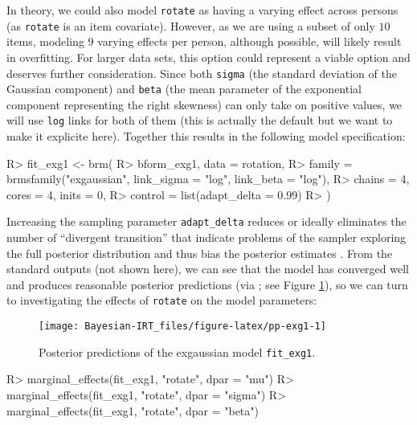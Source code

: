 \documentclass[jss]{jss}
\begin{document}
In theory, we could also model \texttt{rotate} as having a varying
effect across persons (as \texttt{rotate} is an item covariate).
However, as we are using a subset of only \(10\) items, modeling \(9\)
varying effects per person, although possible, will likely result in
overfitting. For larger data sets, this option could represent a viable
option and deserves further consideration. Since both \texttt{sigma}
(the standard deviation of the Gaussian component) and \texttt{beta}
(the mean parameter of the exponential component representing the right
skewness) can only take on positive values, we will use \texttt{log}
links for both of them (this is actually the default but we want to make
it explicite here). Together this results in the following model
specification:

\begin{CodeChunk}

\begin{CodeInput}
R> fit_exg1 <- brm(
R>   bform_exg1, data = rotation,
R>   family = brmsfamily("exgaussian", link_sigma = "log", link_beta = "log"),
R>   chains = 4, cores = 4, inits = 0,
R>   control = list(adapt_delta = 0.99)
R> )
\end{CodeInput}
\end{CodeChunk}

Increasing the sampling parameter \texttt{adapt\_delta} reduces or
ideally eliminates the number of ``divergent transition'' that indicate
problems of the sampler exploring the full posterior distribution and
thus bias the posterior estimates \citep{carpenter2017, hoffman2014}.
From the standard outputs (not shown here), we can see that the model
has converged well and produces reasonable posterior predictions (via
; see Figure \ref{fig:pp-exg1}), so we can turn
to investigating the effects of \texttt{rotate} on the model parameters:

\begin{CodeChunk}
\begin{figure}

{\centering \texttt{[image: Bayesian-IRT\_files/figure-latex/pp-exg1-1]} 

}

\caption[Posterior predictions of the exgaussian model \texttt{fit\_exg1}]{Posterior predictions of the exgaussian model \texttt{fit\_exg1}.}\label{fig:pp-exg1}
\end{figure}
\end{CodeChunk}

\begin{CodeChunk}

\begin{CodeInput}
R> marginal_effects(fit_exg1, "rotate", dpar = "mu")
R> marginal_effects(fit_exg1, "rotate", dpar = "sigma")
R> marginal_effects(fit_exg1, "rotate", dpar = "beta")
\end{CodeInput}
\end{CodeChunk}
\end{document}
